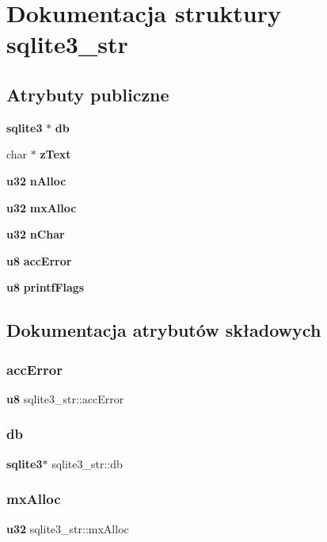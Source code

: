 \section{Dokumentacja struktury sqlite3\+\_\+str}
\label{structsqlite3__str}
\subsection*{Atrybuty publiczne}
\begin{DoxyCompactItemize}
\item 
\textbf{ sqlite3} $\ast$ \textbf{ db}
\item 
char $\ast$ \textbf{ z\+Text}
\item 
\textbf{ u32} \textbf{ n\+Alloc}
\item 
\textbf{ u32} \textbf{ mx\+Alloc}
\item 
\textbf{ u32} \textbf{ n\+Char}
\item 
\textbf{ u8} \textbf{ acc\+Error}
\item 
\textbf{ u8} \textbf{ printf\+Flags}
\end{DoxyCompactItemize}


\subsection{Dokumentacja atrybutów składowych}
\mbox{\label{structsqlite3__str_ad978c5a7084aacfbd144e7aec279da0c}} 
\subsubsection{accError}
{\footnotesize\ttfamily \textbf{ u8} sqlite3\+\_\+str\+::acc\+Error}

\mbox{\label{structsqlite3__str_a7bfd5f4fab60616151f685016159fb60}} 
\subsubsection{db}
{\footnotesize\ttfamily \textbf{ sqlite3}$\ast$ sqlite3\+\_\+str\+::db}

\mbox{\label{structsqlite3__str_afcdd468a5efbc32fa6c57e90b2000b88}} 
\subsubsection{mxAlloc}
{\footnotesize\ttfamily \textbf{ u32} sqlite3\+\_\+str\+::mx\+Alloc}

